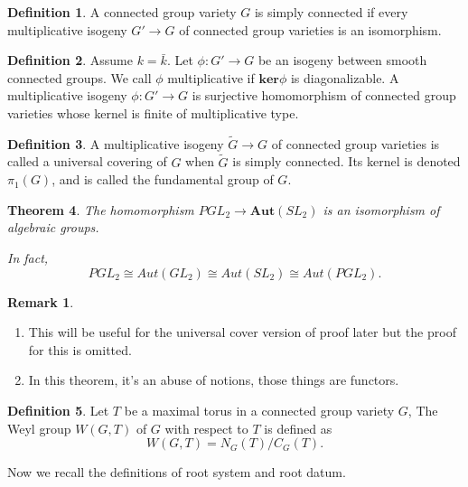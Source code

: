 \documentclass[12pt,a4paper,english]{article}
\theoremstyle{plain}
\newtheorem{thm}{Theorem}[section]
\theoremstyle{definition}
\newtheorem{defi}[thm]{Definition}
\newtheorem*{rem}{Remark}
\begin{document}
\begin{defi}
A connected group variety $G$ is simply connected if every multiplicative isogeny $G'\rightarrow G$ of connected group varieties is an isomorphism.
\end{defi}
\begin{defi}Assume $k=\bar{k}$. 
Let $\phi:G'\rightarrow G$ be an isogeny between smooth connected groups. We call $\phi$ multiplicative if $\textbf{ker}\phi$ is diagonalizable. 
A multiplicative isogeny $\phi: G'\rightarrow G$ is surjective homomorphism of connected group varieties whose kernel is finite of multiplicative type.
\end{defi}
\begin{defi}
A multiplicative isogeny $\tilde{G}\rightarrow G$ of connected group varieties is called a universal covering of $G$ when $\tilde{G}$ is simply connected. Its kernel is denoted $\pi_{1}(G)$, and is called the fundamental group of $G$.
\end{defi}
\begin{thm}
The homomorphism $PGL_{2}\rightarrow \textbf{Aut}(SL_{2})$ is an isomorphism of algebraic groups.

In fact, 
\begin{equation*}
    PGL_{2}\cong Aut(GL_{2})\cong Aut(SL_{2})\cong Aut(PGL_{2}).
\end{equation*}
\end{thm}
\begin{rem}
\begin{enumerate}
    \item This will be useful for the universal cover version of proof later but the proof for this is omitted.
    \item In this theorem, it's an abuse of notions, those things are functors.
\end{enumerate}
\end{rem}
\begin{defi}
Let $T$ be a maximal torus in a connected group variety $G$, The Weyl group $W(G,T)$ of $G$ with respect to $T$ is defined as 
\begin{equation*}
    W(G,T)=N_{G}(T)/C_{G}(T).
\end{equation*}
\end{defi}
Now we recall the definitions of root system and root datum.
\end{document}
